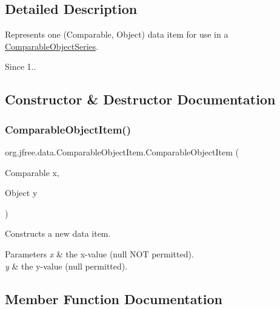\subsection{Detailed Description}
Represents one (Comparable, Object) data item for use in a \mbox{\hyperlink{classorg_1_1jfree_1_1data_1_1_comparable_object_series}{Comparable\+Object\+Series}}.

\begin{DoxySince}{Since}
1.. 
\end{DoxySince}


\subsection{Constructor \& Destructor Documentation}
\mbox{\label{classorg_1_1jfree_1_1data_1_1_comparable_object_item_a4103cac39a038dfb133338e37a76e47b}} 
\subsubsection{\texorpdfstring{Comparable\+Object\+Item()}{ComparableObjectItem()}}
{\footnotesize\ttfamily org.\+jfree.\+data.\+Comparable\+Object\+Item.\+Comparable\+Object\+Item (\begin{DoxyParamCaption}\item[{Comparable}]{x,  }\item[{Object}]{y }\end{DoxyParamCaption})}

Constructs a new data item.


\begin{DoxyParams}{Parameters}
{\em x} & the x-\/value ({\ttfamily null} N\+OT permitted). \\
\hline
{\em y} & the y-\/value ({\ttfamily null} permitted). \\
\hline
\end{DoxyParams}


\subsection{Member Function Documentation}
\mbox{\label{classorg_1_1jfree_1_1data_1_1_comparable_object_item_ae850b795367b84c6857f34e39dff981d}} 
